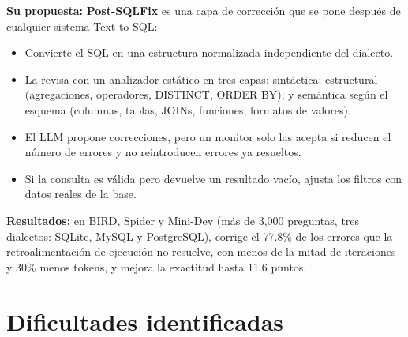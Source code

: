 \documentclass[11pt,a4paper]{article}
\begin{document}
\textbf{Su propuesta:} \textbf{Post-SQLFix} es una capa de corrección que se pone después de cualquier sistema Text-to-SQL:
\begin{itemize}
  \item Convierte el SQL en una estructura normalizada independiente del dialecto.
  \item La revisa con un analizador estático en tres capas: sintáctica; estructural (agregaciones, operadores, DISTINCT, ORDER BY); y semántica según el esquema (columnas, tablas, JOINs, funciones, formatos de valores).
  \item El LLM propone correcciones, pero un monitor solo las acepta si reducen el número de errores y no reintroducen errores ya resueltos.
  \item Si la consulta es válida pero devuelve un resultado vacío, ajusta los filtros con datos reales de la base.
\end{itemize}

\textbf{Resultados:} en BIRD, Spider y Mini-Dev (más de 3{,}000 preguntas, tres dialectos: SQLite, MySQL y PostgreSQL), corrige el 77.8\% de los errores que la retroalimentación de ejecución no resuelve, con menos de la mitad de iteraciones y 30\% menos tokens, y mejora la exactitud hasta 11.6 puntos.


\newpage
\part{Dificultades identificadas}

\end{document}
